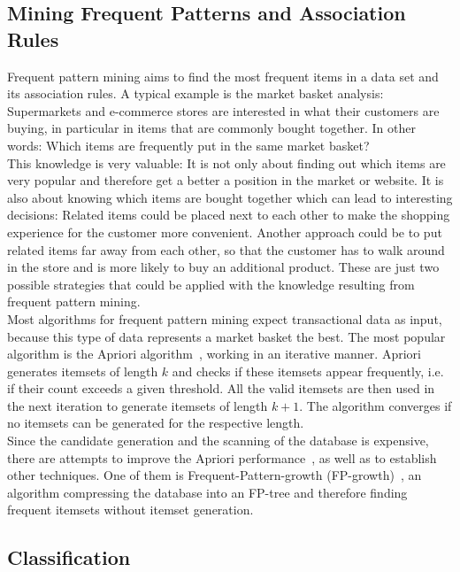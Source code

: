 \subsection{Mining Frequent Patterns and Association Rules}
Frequent pattern mining aims to find the most frequent items in a data set and its association rules. A typical example is the market basket analysis: Supermarkets and e-commerce stores are interested in what their customers are buying, in particular in items that are commonly bought together. In other words: Which items are frequently put in the same market basket?
\\
This knowledge is very valuable: It is not only about finding out which items are very popular and therefore get a better a position in the market or website. It is also about knowing which items are bought together which can lead to interesting decisions: Related items could be placed next to each other to make the shopping experience for the customer more convenient. Another approach could be to put related items far away from each other, so that the customer has to walk around in the store and is more likely to buy an additional product. These are just two possible strategies that could be applied with the knowledge resulting from frequent pattern mining.
\\
Most algorithms for frequent pattern mining expect transactional data as input, because this type of data represents a market basket the best. The most popular algorithm is the Apriori algorithm~\parencite{apriori}, working in an iterative manner. Apriori generates itemsets of length $k$ and checks if these itemsets appear frequently, i.e. if their count exceeds a given threshold. All the valid itemsets are then used in the next iteration to generate itemsets of length $k+1$. The algorithm converges if no itemsets can be generated for the respective length.
\\
Since the candidate generation and the scanning of the database is expensive, there are attempts to improve the Apriori performance~\parencite{ap1}\parencite{ap2}, as well as to establish other techniques. One of them is Frequent-Pattern-growth (FP-growth)~\parencite{fpgrowth}, an algorithm compressing the database into an FP-tree and therefore finding frequent itemsets without itemset generation. 

\subsection{Classification}

